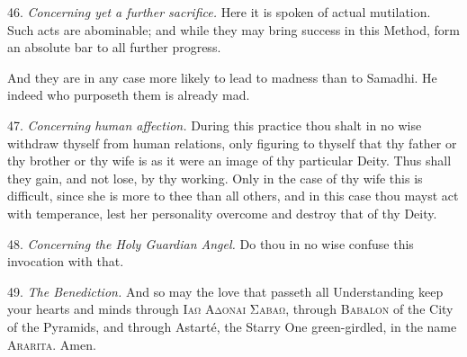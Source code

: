 46. \textit{Concerning yet a further sacrifice.} Here it is spoken of actual mutilation. Such acts are abominable; and while they may bring success in this Method, form an absolute bar to all further progress.

And they are in any case more likely to lead to madness than to Samadhi. He indeed who purposeth them is already mad.

47. \textit{Concerning human affection.} During this practice thou shalt in no wise withdraw thyself from human relations, only figuring to thyself that thy father or thy brother or thy wife is as it were an image of thy particular Deity. Thus shall they gain, and not lose, by thy working. Only in the case of thy wife this is difficult, since she is more to thee than all others, and in this case thou mayst act with temperance, lest her personality overcome and destroy that of thy Deity.

48. \textit{Concerning the Holy Guardian Angel.} Do thou in no wise confuse this invocation with that.

49. \textit{The Benediction.} And so may the love that passeth all Understanding keep your hearts and minds through \textsc{Ιαω Αδοναι Σαβαω}, through \textsc{Babalon} of the City of the Pyramids, and through Astart\'{e}, the Starry One green-girdled, in the name \textsc{Ararita}. Amen.

